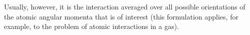 Usually, however, it is the interaction averaged over all possible orientations of the atomic angular momenta that is of interest (this formulation applies, for example, to the problem of atomic interactions in a gas).
